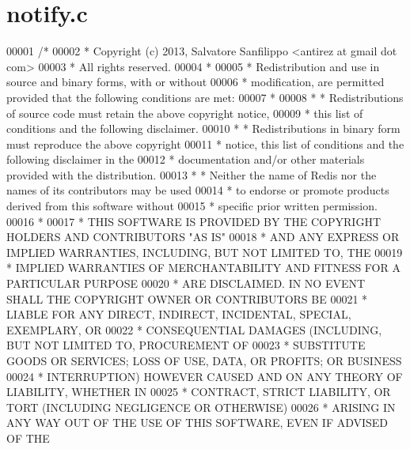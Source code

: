 \hypertarget{notify_8c_source}{}\section{notify.\+c}
\label{notify_8c_source}

\begin{DoxyCode}
00001 \textcolor{comment}{/*}
00002 \textcolor{comment}{ * Copyright (c) 2013, Salvatore Sanfilippo <antirez at gmail dot com>}
00003 \textcolor{comment}{ * All rights reserved.}
00004 \textcolor{comment}{ *}
00005 \textcolor{comment}{ * Redistribution and use in source and binary forms, with or without}
00006 \textcolor{comment}{ * modification, are permitted provided that the following conditions are met:}
00007 \textcolor{comment}{ *}
00008 \textcolor{comment}{ *   * Redistributions of source code must retain the above copyright notice,}
00009 \textcolor{comment}{ *     this list of conditions and the following disclaimer.}
00010 \textcolor{comment}{ *   * Redistributions in binary form must reproduce the above copyright}
00011 \textcolor{comment}{ *     notice, this list of conditions and the following disclaimer in the}
00012 \textcolor{comment}{ *     documentation and/or other materials provided with the distribution.}
00013 \textcolor{comment}{ *   * Neither the name of Redis nor the names of its contributors may be used}
00014 \textcolor{comment}{ *     to endorse or promote products derived from this software without}
00015 \textcolor{comment}{ *     specific prior written permission.}
00016 \textcolor{comment}{ *}
00017 \textcolor{comment}{ * THIS SOFTWARE IS PROVIDED BY THE COPYRIGHT HOLDERS AND CONTRIBUTORS "AS IS"}
00018 \textcolor{comment}{ * AND ANY EXPRESS OR IMPLIED WARRANTIES, INCLUDING, BUT NOT LIMITED TO, THE}
00019 \textcolor{comment}{ * IMPLIED WARRANTIES OF MERCHANTABILITY AND FITNESS FOR A PARTICULAR PURPOSE}
00020 \textcolor{comment}{ * ARE DISCLAIMED. IN NO EVENT SHALL THE COPYRIGHT OWNER OR CONTRIBUTORS BE}
00021 \textcolor{comment}{ * LIABLE FOR ANY DIRECT, INDIRECT, INCIDENTAL, SPECIAL, EXEMPLARY, OR}
00022 \textcolor{comment}{ * CONSEQUENTIAL DAMAGES (INCLUDING, BUT NOT LIMITED TO, PROCUREMENT OF}
00023 \textcolor{comment}{ * SUBSTITUTE GOODS OR SERVICES; LOSS OF USE, DATA, OR PROFITS; OR BUSINESS}
00024 \textcolor{comment}{ * INTERRUPTION) HOWEVER CAUSED AND ON ANY THEORY OF LIABILITY, WHETHER IN}
00025 \textcolor{comment}{ * CONTRACT, STRICT LIABILITY, OR TORT (INCLUDING NEGLIGENCE OR OTHERWISE)}
00026 \textcolor{comment}{ * ARISING IN ANY WAY OUT OF THE USE OF THIS SOFTWARE, EVEN IF ADVISED OF THE}

\end{DoxyCode}
